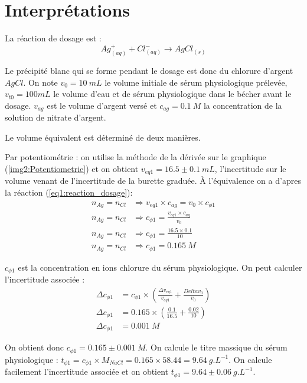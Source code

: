 \documentclass[12pt]{article}
\begin{document}
\newpage
\section{Interprétations}

La réaction de dosage est :
\begin{equation}
    Ag^+_{(aq)} + Cl^-_{(aq)} \longrightarrow AgCl_{(s)}
    \label{eq1:reaction_dosage}
\end{equation}

Le précipité blanc qui se forme pendant le dosage est donc du chlorure d'argent $AgCl$.
On note $v_0=10 \ mL$ le volume initiale de sérum physiologique prélevée, $v_{t0}=100 mL$ le volume d'eau et de sérum physiologique dans le bécher avant le dosage.
$v_{ag}$ est le volume d'argent versé et $c_{ag}=0.1 \ M$ la concentration de la solution de nitrate d'argent. 

Le volume équivalent est déterminé de deux manières. 

Par potentiométrie : on utilise la méthode de la dérivée sur le graphique (\ref{img2:Potentiometrie}) et on obtient $v_{eq1}= 16.5 \pm 0.1 \ mL $, l'incertitude sur le volume venant de l'incertitude de la burette graduée.
À l'équivalence on a d'apres la réaction (\ref{eq1:reaction_dosage}):
\begin{align*}
    n_{Ag}=n_{Cl} & \Longrightarrow  v_{eq1} \times c_{ag} = v_{0} \times c_{\phi 1} \\ 
    n_{Ag}=n_{Cl} & \Longrightarrow  c_{\phi 1} = \frac{v_{eq1} \times c_{ag}}{v_{0}} \\
    n_{Ag}=n_{Cl} & \Longrightarrow  c_{\phi 1} = \frac{16.5 \times 0.1}{10} \\
    n_{Ag}=n_{Cl} & \Longrightarrow  c_{\phi 1} = 0.165  \ M
\end{align*}

$c_{\phi 1}$ est la concentration en ions chlorure du sérum physiologique. 
On peut calculer l'incertitude associée :
\begin{align*}
    \Delta c_{\phi 1} & = c_{\phi 1} \times \left(\frac{\Delta v_{eq1}}{v_{eq1}} + \frac{Delta v_0}{v_0} \right) \\
    \Delta c_{\phi 1} & = 0.165 \times \left( \frac{0.1}{16.5} + \frac{0.02}{10} \right) \\
    \Delta c_{\phi 1} & = 0.001 \ M
\end{align*}

On obtient donc $c_{\phi 1}= 0.165 \pm 0.001 \ M$.
On calcule le titre massique du sérum physiologique : $t_{\phi 1}=c_{\phi 1} \times M_{NaCl}=0.165 \times 58.44 = 9.64 \ g.L^{-1}$.
On calcule facilement l'incertitude associée et on obtient $t_{\phi 1}=9.64 \pm 0.06 \ g.L^{-1}$.
\end{document}
